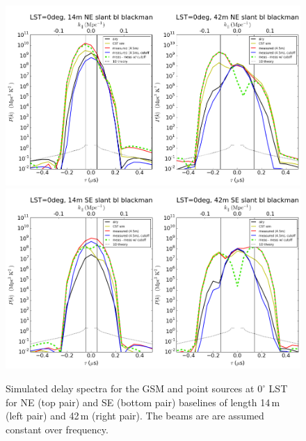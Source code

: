 \documentclass[preprint]{aastex}
\begin{document}
\begin{figure}[h]
\includegraphics[width=6.7in]{LST0deg_14m_42m_NEslantbaselines_dish1_blackman.png}
\includegraphics[width=6.7in]{LST0deg_14m_42m_SEslantbaselines_dish1_blackman.png}
\caption{Simulated delay spectra for the GSM and point sources at $0^\circ$ LST for NE (top pair) and SE (bottom pair) baselines of length 14\,m (left pair) and 42\,m (right pair). The beams are are assumed constant over frequency.}
\label{fig:delayspec2}
\end{figure}







\end{document}

